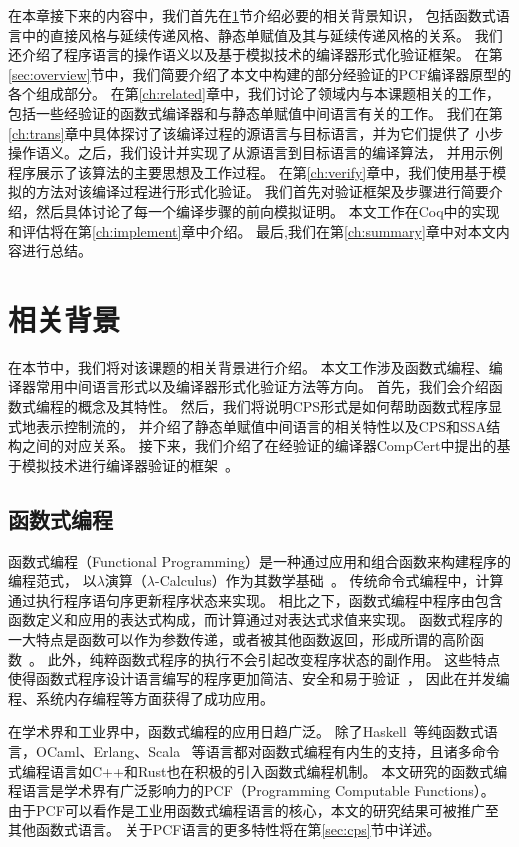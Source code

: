 在本章接下来的内容中，我们首先在\ref{sec:background}节介绍必要的相关背景知识，
包括函数式语言中的直接风格与延续传递风格、静态单赋值及其与延续传递风格的关系。
我们还介绍了程序语言的操作语义以及基于模拟技术的编译器形式化验证框架。
在第\ref{sec:overview}节中，我们简要介绍了本文中构建的部分经验证的PCF编译器原型的各个组成部分。
在第\ref{ch:related}章中，我们讨论了领域内与本课题相关的工作，
包括一些经验证的函数式编译器和与静态单赋值中间语言有关的工作。
我们在第\ref{ch:trans}章中具体探讨了该编译过程的源语言与目标语言，并为它们提供了
小步操作语义。之后，我们设计并实现了从源语言到目标语言的编译算法，
并用示例程序展示了该算法的主要思想及工作过程。
在第\ref{ch:verify}章中，我们使用基于模拟的方法对该编译过程进行形式化验证。
我们首先对验证框架及步骤进行简要介绍，然后具体讨论了每一个编译步骤的前向模拟证明。
本文工作在Coq中的实现和评估将在第\ref{ch:implement}章中介绍。
最后,我们在第\ref{ch:summary}章中对本文内容进行总结。

\section{相关背景} \label{sec:background}

在本节中，我们将对该课题的相关背景进行介绍。
本文工作涉及函数式编程、编译器常用中间语言形式以及编译器形式化验证方法等方向。
首先，我们会介绍函数式编程的概念及其特性。
然后，我们将说明CPS形式是如何帮助函数式程序显式地表示控制流的，
并介绍了静态单赋值中间语言的相关特性以及CPS和SSA结构之间的对应关系。
接下来，我们介绍了在经验证的编译器CompCert中提出的基于模拟技术进行编译器验证的框架~\cite{leroy2009formally}。

\subsection{函数式编程}

函数式编程（Functional Programming）是一种通过应用和组合函数来构建程序的编程范式，
以$\lambda$演算（$\lambda$-Calculus）作为其数学基础~\cite{church1985calculi}。
传统命令式编程中，计算通过执行程序语句序更新程序状态来实现。
相比之下，函数式编程中程序由包含函数定义和应用的表达式构成，而计算通过对表达式求值来实现。
函数式程序的一大特点是函数可以作为参数传递，或者被其他函数返回，形成所谓的高阶函数~\cite{sussman1998scheme}。
此外，纯粹函数式程序的执行不会引起改变程序状态的副作用。
这些特点使得函数式程序设计语言编写的程序更加简洁、安全和易于验证~\cite{hudak1989conception}，
因此在并发编程、系统内存编程等方面获得了成功应用。

在学术界和工业界中，函数式编程的应用日趋广泛。
除了Haskell~\cite{o2008real}等纯函数式语言，OCaml、Erlang、Scala~\cite{cesarini2009erlang, odersky2014unifying}
等语言都对函数式编程有内生的支持，且诸多命令式编程语言如C++和Rust也在积极的引入函数式编程机制。
本文研究的函数式编程语言是学术界有广泛影响力的PCF（Programming Computable Functions）。
由于PCF可以看作是工业用函数式编程语言的核心，本文的研究结果可被推广至其他函数式语言。
关于PCF语言的更多特性将在第\ref{sec:cps}节中详述。

